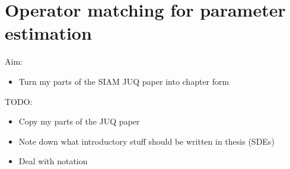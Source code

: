 \documentclass[main.tex]{subfiles}
\begin{document}
\chapter{Operator matching for parameter estimation}


Aim:
\begin{itemize}
\item Turn my parts of the SIAM JUQ paper into chapter form
\end{itemize}

TODO:
\begin{itemize}
\item Copy my parts of the JUQ paper
\item Note down what introductory stuff should be written in thesis (SDEs)
\item Deal with notation
\end{itemize}

\biblio{} %
\end{document}

